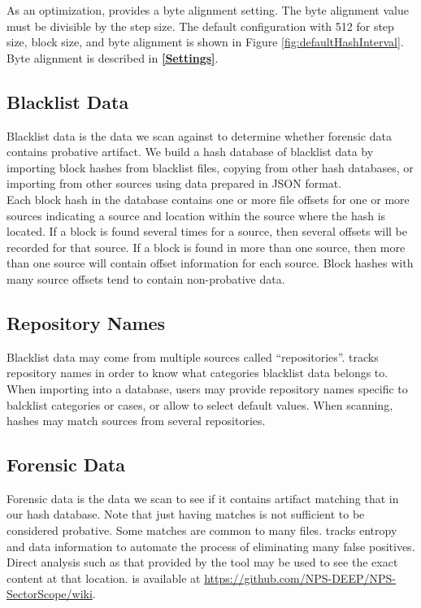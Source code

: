 \documentclass[11pt,fleqn]{article} %
\begin{document}
As an optimization, \hdb provides a byte alignment setting. The byte alignment value must be divisible by the step size. The default configuration with 512 for step size, block size, and byte alignment is shown in Figure \ref{fig:defaultHashInterval}. Byte alignment is described in \textbf{\autoref{Settings}}.\\

\subsection{Blacklist Data}
Blacklist data is the data we scan against to determine whether forensic data
contains probative artifact.
We build a hash database of blacklist data by importing block hashes
from blacklist files, copying from other hash databases,
or importing from other sources using data prepared in JSON format.\\

Each block hash in the database contains one or more file offsets for one or more sources indicating a source and location within the source where the hash is located.  If a block is found several times for a source, then several offsets will be recorded for that source. If a block is found in more than one source, then more than one source will contain offset information for each source. Block hashes with many source offsets tend to contain non-probative data.\\

\subsection{Repository Names}
Blacklist data may come from multiple sources called ``repositories''. \hdb tracks repository names in order to know what categories blacklist data belongs to. When importing into a database, users may provide repository names specific to balcklist categories or cases, or allow \hdb to select default values.  When scanning, hashes may match sources from several repositories.\\

\subsection{Forensic Data}
Forensic data is the data we scan to see if it contains artifact matching
that in our hash database.
Note that just having matches is not sufficient to be considered probative.
Some matches are common to many files.
\hdb tracks entropy and data information to automate the process
of eliminating many false positives.
Direct analysis such as that provided by the \sscope tool
may be used to see the exact content at that location.
\sscope is available at \url{https://github.com/NPS-DEEP/NPS-SectorScope/wiki}.
\end{document}
